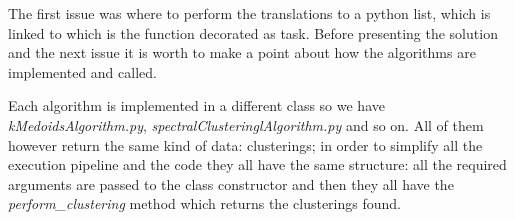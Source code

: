 The first issue was where to perform the translations to a python list, which is linked to which is the function decorated as task. Before presenting the solution and the next issue it is worth to make a point about how the algorithms are implemented and called. 

Each algorithm is implemented in a different class so we have \textit{kMedoidsAlgorithm.py}, \textit{spectralClusteringlAlgorithm.py} and so on. All of them however return the same kind of data: clusterings; in order to simplify all the execution pipeline and the code they all have the same structure: all the required arguments are passed to the class constructor and then they all have the \textit{perform\_clustering} method which returns the clusterings found.  




